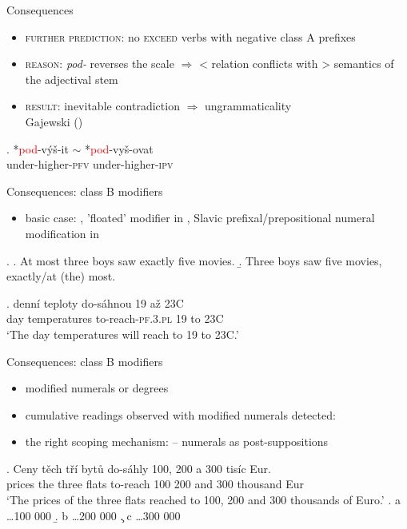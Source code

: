 \documentclass[12pt]{beamer}
\begin{document}
\begin{frame}{Consequences}

\begin{itemize}
\item \textsc{further prediction}: no \textsc{exceed} verbs with negative class A prefixes
\item \textsc{reason}: \textit{pod-} reverses the scale $\Rightarrow$ < relation conflicts with > semantics of the adjectival stem
\item \textsc{result}: inevitable contradiction $\Rightarrow$ ungrammaticality\\\scriptsize Gajewski (\citeyear{gajewski2002analycity})\normalsize
\end{itemize}

\exg. *{\textcolor{red}{pod}-výš-it $\sim$} *\textcolor{red}{pod}-vyš-ovat\\
under-higher-\textsc{pfv} under-higher-\textsc{ipv}\\

\end{frame}

\begin{frame}{Consequences: class B modifiers}

\begin{itemize}
\item basic case: \Next[a], 'floated' modifier in \Next[b], Slavic prefixal/prepositional numeral modification in \NNext
\end{itemize}

\ex. \a. At most three boys saw exactly five movies.
\b. Three boys saw five movies, exactly/at (the) most.

\exg. denní teploty do-sáhnou 19 až 23\degree C\\
day temperatures to-reach-\textsc{pf.3.pl} 19 to 23\degree C\\
`The day temperatures will reach to 19 to 23\degree C.'


\end{frame}

\begin{frame}{Consequences: class B modifiers}

\begin{itemize}
\item modified numerals or degrees
\item cumulative readings observed with modified numerals detected: \Next
\item the right scoping mechanism: \cite{brasoveanu2012modified} -- numerals as post-suppositions
\end{itemize}

\exg. Ceny těch tří bytů do-sáhly 100, 200 a 300 tisíc Eur.\\
prices the three flats to-reach 100 200 and 300 thousand Eur\\
`The prices of the three flats reached to 100, 200 and 300 thousands of Euro.'
\a. a \ldots 100 000
\b. b \ldots 200 000
\c. c \ldots 300 000

\end{frame}
\end{document}

